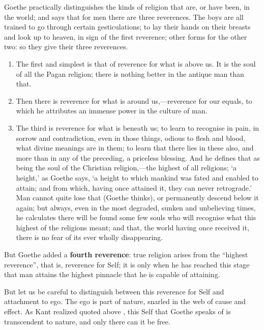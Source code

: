 \begin{quotex} 
Goethe practically distinguishes the kinds of religion that are, or have been, in the world; and says that for men there are three reverences. The boys are all trained to go through certain gesticulations; to lay their hands on their breasts and look up to heaven, in sign of the first reverence; other forms for the other two: so they give their three reverences.

\begin{enumerate}


\item The first and simplest is that of reverence for what is above us. It is the soul of all the Pagan religion; there is nothing better in the antique man than that.

\item Then there is reverence for what is around us,---reverence for our equals, to which he attributes an immense power in the culture of man.

\item The third is reverence for what is beneath us; to learn to recognise in pain, in sorrow and contradiction, even in those things, odious to flesh and blood, what divine meanings are in them; to learn that there lies in these also, and more than in any of the preceding, a priceless blessing. And he defines that as being the soul of the Christian religion,---the highest of all religions; `a height,' as Goethe says, `a height to which mankind was fated and enabled to attain; and from which, having once attained it, they can never retrograde.' Man cannot quite lose that (Goethe thinks), or permanently descend below it again; but always, even in the most degraded, sunken and unbelieving times, he calculates there will be found some few souls who will recognise what this highest of the religions meant; and that, the world having once received it, there is no fear of its ever wholly disappearing.
\end{enumerate}
\end{quotex}


But Goethe added a \textbf{fourth reverence}: true religion arises from the ``highest reverence'', that is, reverence for Self; it is only when he has reached this stage that man attains the highest pinnacle that he is capable of attaining.

But let us be careful to distinguish between this reverence for Self and attachment to ego. The ego is part of nature, snarled in the web of cause and effect. As Kant realized quoted above , this Self that Goethe speaks of is transcendent to nature, and only there can it be free.

